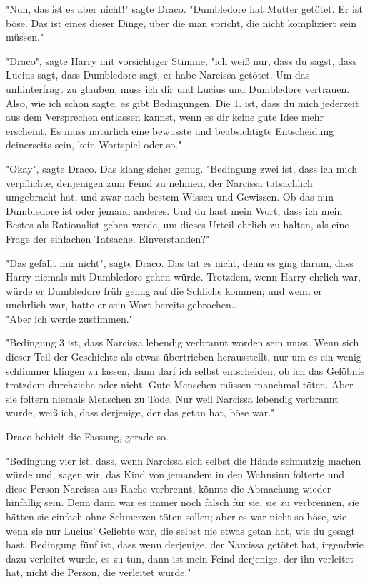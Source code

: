 {"Nun, das ist es aber nicht!" sagte Draco. "Dumbledore hat Mutter getötet. Er ist böse. Das ist eines dieser Dinge, über die man spricht, die nicht kompliziert sein müssen."

"Draco", sagte Harry mit vorsichtiger Stimme, "ich weiß nur, dass du sagst, dass Lucius sagt, dass Dumbledore sagt, er habe Narcissa getötet. Um das unhinterfragt zu glauben, muss ich dir und Lucius und Dumbledore vertrauen. Also, wie ich schon sagte, es gibt Bedingungen. Die 1. ist, dass du mich jederzeit aus dem Versprechen entlassen kannst, wenn es dir keine gute Idee mehr erscheint. Es muss natürlich eine bewusste und beabsichtigte Entscheidung deinerseits sein, kein Wortspiel oder so."

"Okay", sagte Draco. Das klang sicher genug. "Bedingung zwei ist, dass ich mich verpflichte, denjenigen zum Feind zu nehmen, der Narcissa tatsächlich umgebracht hat, und zwar nach bestem Wissen und Gewissen. Ob das nun Dumbledore ist oder jemand anderes. Und du hast mein Wort, dass ich mein Bestes als Rationalist geben werde, um dieses Urteil ehrlich zu halten, als eine Frage der einfachen Tatsache. Einverstanden?"

"Das gefällt mir nicht", sagte Draco. Das tat es nicht, denn es ging darum, dass Harry niemals mit Dumbledore gehen würde. Trotzdem, wenn Harry ehrlich war, würde er Dumbledore früh genug auf die Schliche kommen; und wenn er unehrlich war, hatte er sein Wort bereits gebrochen…\\ "Aber ich werde zustimmen."

"Bedingung 3 ist, dass Narcissa lebendig verbrannt worden sein muss. Wenn sich dieser Teil der Geschichte als etwas übertrieben herausstellt, nur um es ein wenig schlimmer klingen zu lassen, dann darf ich selbst entscheiden, ob ich das Gelöbnis trotzdem durchziehe oder nicht. Gute Menschen müssen manchmal töten. Aber sie foltern niemals Menschen zu Tode. Nur weil Narcissa lebendig verbrannt wurde, weiß ich, dass derjenige, der das getan hat, böse war."

Draco behielt die Fassung, gerade so.

"Bedingung vier ist, dass, wenn Narcissa sich selbst die Hände schmutzig machen würde und, sagen wir, das Kind von jemandem in den Wahnsinn folterte und diese Person Narcissa aus Rache verbrennt, könnte die Abmachung wieder hinfällig sein. Denn dann war es immer noch falsch für sie, sie zu verbrennen, sie hätten sie einfach ohne Schmerzen töten sollen; aber es war nicht so böse, wie wenn sie nur Lucius' Geliebte war, die selbst nie etwas getan hat, wie du gesagt hast. Bedingung fünf ist, dass wenn derjenige, der Narcissa getötet hat, irgendwie dazu verleitet wurde, es zu tun, dann ist mein Feind derjenige, der ihn verleitet hat, nicht die Person, die verleitet wurde."

}
